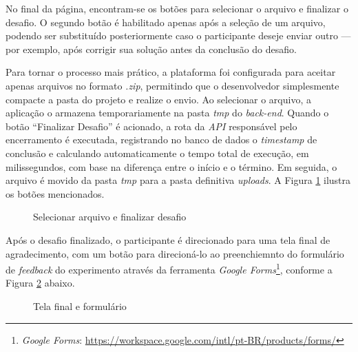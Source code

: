 \documentclass[english,brazilian]{UNISINOSartigo} %
\begin{document}
No final da página, encontram-se os botões para selecionar o arquivo e finalizar o desafio. O segundo botão é habilitado apenas após a seleção de um arquivo, podendo ser substituído posteriormente caso o participante deseje enviar outro — por exemplo, após corrigir sua solução antes da conclusão do desafio.

Para tornar o processo mais prático, a plataforma foi configurada para aceitar apenas arquivos no formato \textit{.zip}, permitindo que o desenvolvedor simplesmente compacte a pasta do projeto e realize o envio. Ao selecionar o arquivo, a aplicação o armazena temporariamente na pasta \textit{tmp} do \textit{back-end}. Quando o botão “Finalizar Desafio” é acionado, a rota da \textit{API} responsável pelo encerramento é executada, registrando no banco de dados o \textit{timestamp} de conclusão e calculando automaticamente o tempo total de execução, em milissegundos, com base na diferença entre o início e o término. Em seguida, o arquivo é movido da pasta \textit{tmp} para a pasta definitiva \textit{uploads}. A Figura \ref{fig:selecionar_arquivo_finalizar_desafio} ilustra os botões mencionados.

\begin{figure}[ht]
    \caption{Selecionar arquivo e finalizar desafio}
    \label{fig:selecionar_arquivo_finalizar_desafio}
    \centering
    \footnotesize
    \begin{minipage}{.9\textwidth}
        \centering
    \end{minipage}
\end{figure}
\FloatBarrier

Após o desafio finalizado, o participante é direcionado para uma tela final de agradecimento, com um botão para direcioná-lo ao preenchiemnto do formulário de \textit{feedback} do experimento através da ferramenta \textit{Google Forms}\footnote{\textit{Google Forms}: \url{https://workspace.google.com/intl/pt-BR/products/forms/}}, conforme a Figura \ref{fig:tela_final_formulario} abaixo.

\begin{figure}[ht]
    \caption{Tela final e formulário}
    \label{fig:tela_final_formulario}
    \centering
    \footnotesize
    \begin{minipage}{.9\textwidth}
        \centering
    \end{minipage}
\end{figure}
\FloatBarrier
\end{document}
